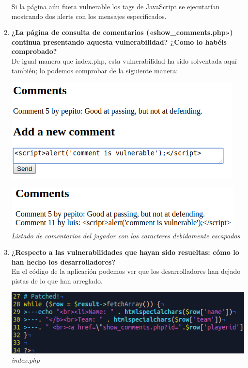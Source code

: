 \documentclass[10pt,a4paper]{article}
\begin{document}
\begin{enumerate}
Si la página aún fuera vulnerable los tags de JavaScript se ejecutarían mostrando dos alerts con los mensajes especificados.

\item \textbf{¿La página de consulta de comentarios («show\_comments.php») continua
presentando aquesta vulnerabilidad? ¿Como lo habéis comprobado?}\\
De igual manera que index.php, esta vulnerabilidad ha sido solventada aquí también; lo podemos comprobar de la siguiente manera:

\begin{center}
\includegraphics[scale=0.6]{comment.png}\\
\end{center}

\begin{center}
\includegraphics[scale=0.6]{comment2.png}\\
\textit{Listado de comentarios del jugador con los caracteres debidamente escapados}
\end{center}

\item \textbf{¿Respecto a las vulnerabilidades que hayan sido resueltas: cómo lo han hecho los
desarrolladores?}\\
En el código de la aplicación podemos ver que los desarrolladores han dejado pistas de lo que han arreglado.\\

\begin{center}
\includegraphics[scale=0.6]{index.png}\\
\textit{index.php}
\end{center}


\end{enumerate}
\end{document}

